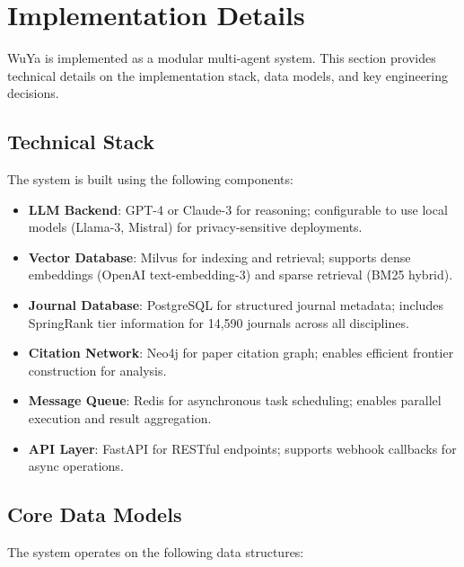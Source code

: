 \section{Implementation Details}
\label{sec:implementation}

WuYa is implemented as a modular multi-agent system. This section provides technical details on the implementation stack, data models, and key engineering decisions.

\subsection{Technical Stack}

The system is built using the following components:

\begin{itemize}
    \item \textbf{LLM Backend}: GPT-4 or Claude-3 for \subagent{} reasoning; configurable to use local models (Llama-3, Mistral) for privacy-sensitive deployments.
    \item \textbf{Vector Database}: Milvus for \rag{} indexing and retrieval; supports dense embeddings (OpenAI text-embedding-3) and sparse retrieval (BM25 hybrid).
    \item \textbf{Journal Database}: PostgreSQL for structured journal metadata; includes SpringRank tier information for 14,590 journals across all disciplines.
    \item \textbf{Citation Network}: Neo4j for paper citation graph; enables efficient frontier construction for \dea{} analysis.
    \item \textbf{Message Queue}: Redis for asynchronous task scheduling; enables parallel \subagent{} execution and result aggregation.
    \item \textbf{API Layer}: FastAPI for RESTful endpoints; supports webhook callbacks for async operations.
\end{itemize}

\subsection{Core Data Models}

The system operates on the following data structures:


